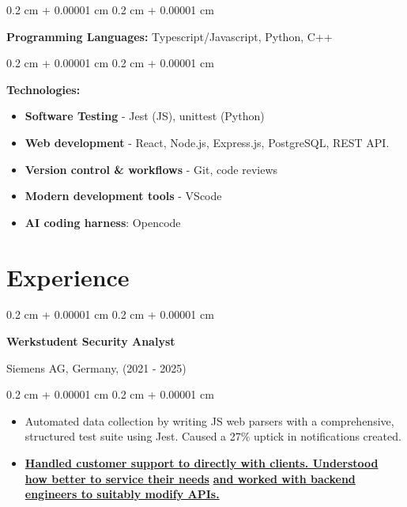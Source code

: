 \documentclass[10pt, letterpaper]{article}
\newenvironment{highlights}{
    \begin{itemize}[
        topsep=0.10 cm,
        parsep=0.10 cm,
        partopsep=0pt,
        itemsep=0pt,
        leftmargin=0.4 cm + 10pt
    ]
}{
    \end{itemize}
} %
\newenvironment{onecolentry}{
    \begin{adjustwidth}{
        0.2 cm + 0.00001 cm
    }{
        0.2 cm + 0.00001 cm
    }
}{
    \end{adjustwidth}
} %
\newcommand{\ubf}[1]{\underline{\textbf{#1}}}
\begin{document}
    
    \begin{onecolentry}
        \textbf{Programming Languages:} {Typescript/Javascript}, {Python}, C++
    \end{onecolentry}

    \vspace{0.2 cm}

    \begin{onecolentry}
        \textbf{Technologies:} 
        \begin{itemize}
            \item \textbf{Software Testing} - {Jest (JS)}, {unittest (Python)}
            \item \textbf{Web development} - {{React}, {Node.js}, Express.js}, PostgreSQL, REST API.
            \item \textbf{Version control \& workflows} - {Git}, code reviews
            \item \textbf{Modern development tools} - VScode
            \item \textbf{AI coding harness}: {Opencode}
        \end{itemize}
        
    \end{onecolentry}


    \section{Experience}

        \begin{onecolentry}
            \textbf{Werkstudent Security Analyst}
            
            {Siemens AG, Germany, (2021 - 2025)}
        \end{onecolentry}

        \vspace{0.10 cm}
        \begin{onecolentry}
            \begin{highlights}
                \item {Automated data collection by writing {JS web parsers}} with a comprehensive, structured test suite using {Jest}. Caused a {27\% uptick in notifications created}.
                \item \ubf{Handled customer support to directly with clients. Understood how better to service their needs} \ubf{and worked with backend engineers to suitably modify APIs.}
            \end{highlights}
        \end{onecolentry}
\end{document}
